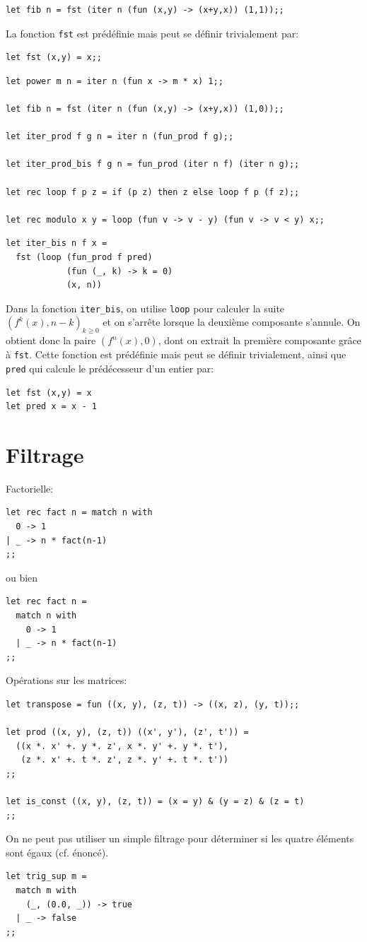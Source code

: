 \documentclass[11pt, a4paper]{article}
\begin{document}
\begin{verbatim}
let fib n = fst (iter n (fun (x,y) -> (x+y,x)) (1,1));;
\end{verbatim}

\noindent La fonction \texttt{fst} est prédéfinie mais peut se définir
trivialement par:
\begin{verbatim}
let fst (x,y) = x;;
\end{verbatim}
\begin{verbatim}
let power m n = iter n (fun x -> m * x) 1;;

let fib n = fst (iter n (fun (x,y) -> (x+y,x)) (1,0));;

let iter_prod f g n = iter n (fun_prod f g);;

let iter_prod_bis f g n = fun_prod (iter n f) (iter n g);;

let rec loop f p z = if (p z) then z else loop f p (f z);;

let rec modulo x y = loop (fun v -> v - y) (fun v -> v < y) x;;
\end{verbatim}
\begin{verbatim}
let iter_bis n f x =
  fst (loop (fun_prod f pred)
            (fun (_, k) -> k = 0)
            (x, n))
\end{verbatim}
Dans la fonction {\tt iter\_bis}, on utilise {\tt loop} pour calculer
la suite $(f^k(x), n-k)_{k \geq 0}$ et on s'arrête lorsque la deuxième
composante s'annule. On obtient donc la paire $(f^n(x), 0)$, dont on
extrait la première composante grâce à {\tt fst}. Cette fonction est
prédéfinie mais peut se définir trivialement, ainsi que \texttt{pred}
qui calcule le prédécesseur d'un entier par:
\begin{verbatim}
let fst (x,y) = x
let pred x = x - 1
\end{verbatim}

\section{Filtrage}

\noindent Factorielle:
\begin{verbatim}
let rec fact n = match n with
  0 -> 1
| _ -> n * fact(n-1)
;;
\end{verbatim}

\noindent ou bien
\begin{verbatim}
let rec fact n =
  match n with
    0 -> 1
  | _ -> n * fact(n-1)
;;
\end{verbatim}

\noindent Opérations sur les matrices:
\begin{verbatim}
let transpose = fun ((x, y), (z, t)) -> ((x, z), (y, t));;

let prod ((x, y), (z, t)) ((x', y'), (z', t')) =
  ((x *. x' +. y *. z', x *. y' +. y *. t'),
   (z *. x' +. t *. z', z *. y' +. t *. t'))
;;

let is_const ((x, y), (z, t)) = (x = y) & (y = z) & (z = t)
;;
\end{verbatim}

\noindent On ne peut pas utiliser un simple filtrage pour déterminer
si les quatre éléments sont égaux (cf. énoncé).
\begin{verbatim}
let trig_sup m =
  match m with
    (_, (0.0, _)) -> true
  | _ -> false
;;
\end{verbatim}
\end{document}
